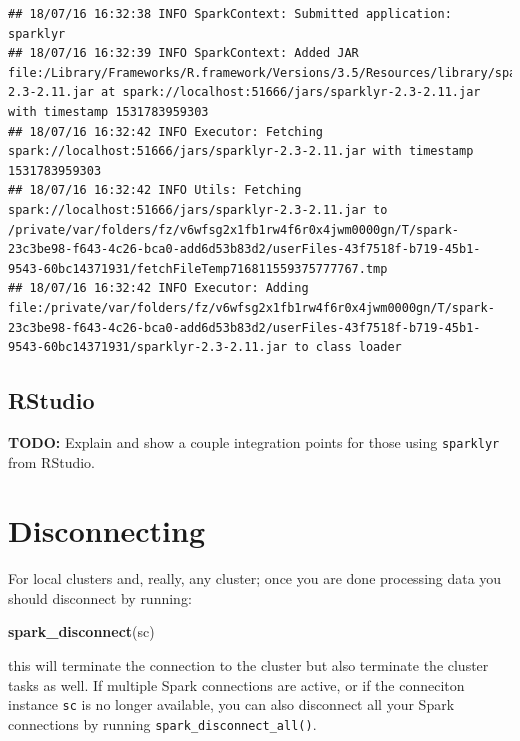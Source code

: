 \documentclass[]{book}
\newenvironment{Shaded}{\begin{snugshade}}{\end{snugshade}}
\newcommand{\KeywordTok}[1]{\textcolor[rgb]{0.13,0.29,0.53}{\textbf{#1}}}
\newcommand{\NormalTok}[1]{#1}
\theoremstyle{definition}
\theoremstyle{definition}
\theoremstyle{definition}
\theoremstyle{remark}
\begin{document}
\begin{verbatim}
## 18/07/16 16:32:38 INFO SparkContext: Submitted application: sparklyr
## 18/07/16 16:32:39 INFO SparkContext: Added JAR file:/Library/Frameworks/R.framework/Versions/3.5/Resources/library/sparklyr/java/sparklyr-2.3-2.11.jar at spark://localhost:51666/jars/sparklyr-2.3-2.11.jar with timestamp 1531783959303
## 18/07/16 16:32:42 INFO Executor: Fetching spark://localhost:51666/jars/sparklyr-2.3-2.11.jar with timestamp 1531783959303
## 18/07/16 16:32:42 INFO Utils: Fetching spark://localhost:51666/jars/sparklyr-2.3-2.11.jar to /private/var/folders/fz/v6wfsg2x1fb1rw4f6r0x4jwm0000gn/T/spark-23c3be98-f643-4c26-bca0-add6d53b83d2/userFiles-43f7518f-b719-45b1-9543-60bc14371931/fetchFileTemp716811559375777767.tmp
## 18/07/16 16:32:42 INFO Executor: Adding file:/private/var/folders/fz/v6wfsg2x1fb1rw4f6r0x4jwm0000gn/T/spark-23c3be98-f643-4c26-bca0-add6d53b83d2/userFiles-43f7518f-b719-45b1-9543-60bc14371931/sparklyr-2.3-2.11.jar to class loader
\end{verbatim}

\hypertarget{using-spark-from-rstudio}{%
\subsection{RStudio}\label{using-spark-from-rstudio}}

\textbf{TODO:} Explain and show a couple integration points for those
using \texttt{sparklyr} from RStudio.

\hypertarget{disconnecting}{%
\section{Disconnecting}\label{disconnecting}}

For local clusters and, really, any cluster; once you are done
processing data you should disconnect by running:

\begin{Shaded}
\begin{Highlighting}[]
\KeywordTok{spark_disconnect}\NormalTok{(sc)}
\end{Highlighting}
\end{Shaded}

this will terminate the connection to the cluster but also terminate the
cluster tasks as well. If multiple Spark connections are active, or if
the conneciton instance \texttt{sc} is no longer available, you can also
disconnect all your Spark connections by running
\texttt{spark\_disconnect\_all()}.
\end{document}
